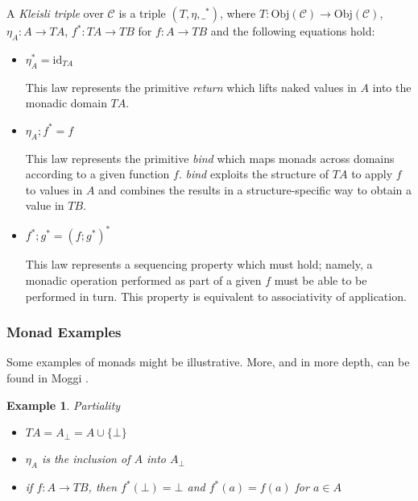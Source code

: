 \documentclass[ms]{byuprop}
\newcounter{example}
\begin{document}
\begin{kleisli}
A \emph{Kleisli triple} over $\mathcal{C}$ is a triple $(T,\eta,\_^{*})$, where
$T:\mathrm{Obj}(\mathcal{C})\rightarrow \mathrm{Obj}(\mathcal{C})$, $\eta_{A}:A\rightarrow TA$,
$f^{*}:TA\rightarrow TB$ for $f:A\rightarrow TB$ and the following equations hold:

\begin{itemize}
\item $\eta_{A}^{*}=\mathrm{id}_{TA}$

This law represents the primitive \emph{return} which lifts naked values in $A$ into the monadic domain $TA$.

\item $\eta_{A};f^{*}=f$

This law represents the primitive \emph{bind} which maps monads across domains according to a given function $f$. \emph{bind} exploits the structure of $TA$ to apply $f$ to values in $A$ and combines the results in a structure-specific way to obtain a value in $TB$.

\item $f^{*};g^{*}=(f;g^{*})^{*}$

This law represents a sequencing property which must hold; namely, a monadic operation performed as part of a given $f$ must be able to be performed in turn. This property is equivalent to associativity of application.
\end{itemize}
\end{kleisli}

\subsubsection{Monad Examples}

Some examples of monads might be illustrative. More, and in more depth, can be found in 
Moggi \cite{moggi1991notions}.

\newtheorem{partiality}[example]{Example}

\begin{partiality}
Partiality

\begin{itemize}
\item $TA=A_{\bot}=A\cup \{\bot\}$
\item $\eta_{A}$ is the inclusion of $A$ into $A_{\bot}$
\item if $f:A\rightarrow TB$, then $f^{*}(\bot)=\bot$ and $f^{*}(a)=f(a)$ for $a\in A$
\end{itemize}
\end{partiality}
\end{document}
